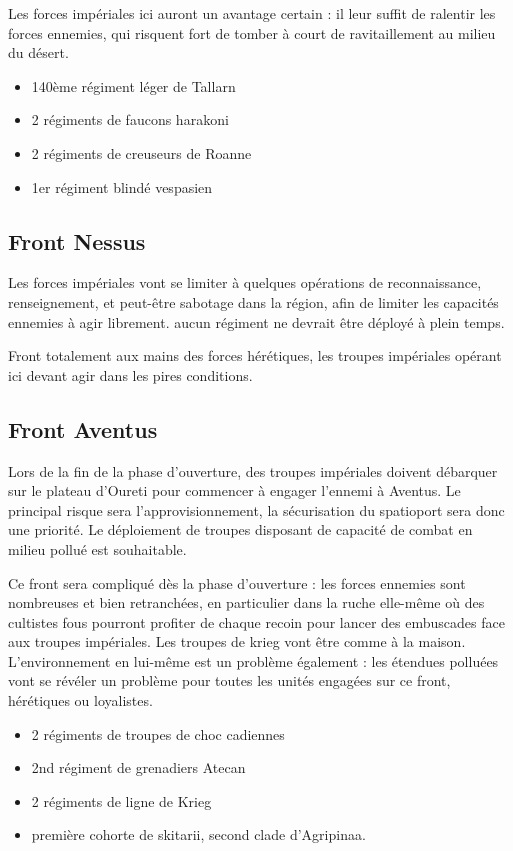 \documentclass[10pt,a4paper]{book}
\begin{document}
Les forces impériales ici auront un avantage certain : il leur suffit de ralentir les forces ennemies, qui risquent fort de tomber à court de ravitaillement au milieu du désert.
\begin{itemize}
\item 140ème régiment léger de Tallarn
\item 2 régiments de faucons harakoni
\item 2 régiments de creuseurs de  Roanne
\item 1er régiment blindé vespasien
\end{itemize}
\subsection{Front Nessus}
Les forces impériales vont se limiter à quelques opérations de reconnaissance, renseignement, et peut-être sabotage dans la région, afin de limiter les capacités ennemies à agir librement. aucun régiment ne devrait être déployé à plein temps.

Front totalement aux mains des forces hérétiques, les troupes impériales opérant ici devant agir dans les pires conditions.
\subsection{Front Aventus}
Lors de la fin de la phase d'ouverture, des troupes impériales doivent débarquer sur le plateau d'Oureti pour commencer à engager l'ennemi à Aventus. Le principal risque sera l'approvisionnement, la sécurisation du spatioport sera donc une priorité. Le déploiement de troupes disposant de capacité de combat en milieu pollué est souhaitable.

Ce front sera compliqué dès la phase d'ouverture : les forces ennemies sont nombreuses et bien retranchées, en particulier dans la ruche elle-même où des cultistes fous pourront profiter de chaque recoin pour lancer des embuscades face aux troupes impériales. Les troupes de krieg vont être comme à la maison. L'environnement en lui-même est un problème également : les étendues polluées vont se révéler un problème pour toutes les unités engagées sur ce front, hérétiques ou loyalistes.
\begin{itemize}
\item 2 régiments de troupes de choc cadiennes
\item 2nd régiment de grenadiers Atecan
\item 2 régiments de ligne de Krieg
\item première cohorte de skitarii, second clade d'Agripinaa.
\end{itemize}
\end{document}
